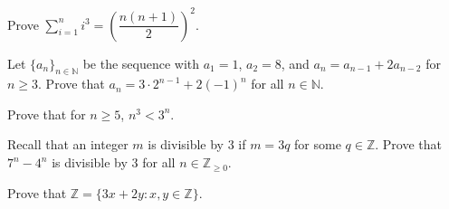 \documentclass[11pt,letterpaper]{article}
\begin{document}
\homework{}

 Prove $\displaystyle \sum_{i=1}^n i^3= \left( \dfrac{n(n + 1)}{2} \right)^2$. 





\newpage





 Let $\{ a_n \}_{n \in \mathbb{N}}$ be the sequence with $a_1= 1$, $a_2= 8$, and $a_n= a_{n-1} + 2a_{n-2}$ for $n \geq 3$. Prove that $a_n= 3 \cdot 2^{n-1} + 2(-1)^n$ for all $n \in \mathbb{N}$. 





\newpage





 Prove that for $n \geq 5$, $n^3 < 3^n$. 





\newpage





 Recall that an integer $m$ is divisible by 3 if $m= 3q$ for some $q \in \mathbb{Z}$. Prove that $7^n - 4^n$ is divisible by 3 for all $n \in \mathbb{Z}_{\geq 0}$. 





\newpage





 Prove that $\mathbb{Z}= \{ 3x + 2y \colon x, y \in \mathbb{Z} \}$. 
\end{document}
